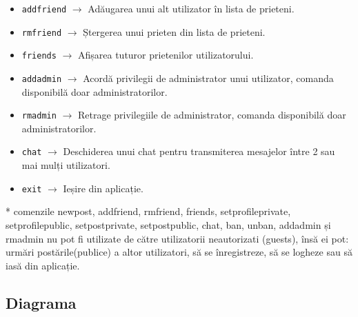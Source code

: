 \documentclass{article}
\begin{document}
\begin{itemize}
    \item \texttt{add\textunderscore friend} $\rightarrow$ Adăugarea unui alt utilizator în lista de prieteni.

    \item \texttt{rm\textunderscore friend} $\rightarrow$ Ștergerea unui prieten din lista de prieteni.

    \item \texttt{friends} $\rightarrow$ Afișarea tuturor prietenilor utilizatorului.

    \item \texttt{add\textunderscore admin} $\rightarrow$ Acordă privilegii de administrator unui utilizator, comanda disponibilă doar administratorilor.

    \item \texttt{rm\textunderscore admin} $\rightarrow$ Retrage privilegiile de administrator, comanda disponibilă doar administratorilor.

    \item \texttt{chat} $\rightarrow$ Deschiderea unui chat pentru transmiterea mesajelor între 2 sau mai mulți utilizatori.

    \item \texttt{exit} $\rightarrow$ Ieșire din aplicație.
\end{itemize}

* comenzile new\textunderscore post, add\textunderscore friend, rm\textunderscore friend, friends, setprofile\textunderscore private, setprofile\textunderscore public, setpost\textunderscore private, setpost\textunderscore public, chat, ban, unban, add\textunderscore admin și rm\textunderscore admin nu pot fi utilizate de către utilizatorii neautorizati (guests), însă ei pot: urmări postările(publice) a altor utilizatori, să se înregistreze, să se logheze sau să iasă din aplicație.

\subsection{Diagrama}


\end{document}
